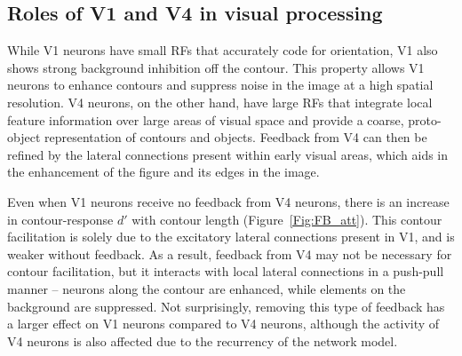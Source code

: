 {\subsection{Roles of V1 and V4 in visual processing}
While V1 neurons have
small RFs that accurately code for orientation, V1 also shows strong
background inhibition off the contour. This property allows V1 neurons
to enhance contours and suppress noise in the image at a high spatial
resolution. V4 neurons, on the other hand, have large RFs that integrate
local feature information over large areas of visual space and provide
a coarse, proto-object representation of contours and objects.
Feedback from V4 can then be refined by the lateral connections present
within early visual areas, which aids in the enhancement of the figure
and its edges in the image.



Even when V1 neurons receive no feedback from V4 neurons,
there is an increase in contour-response $d'$ with contour
length (Figure~\ref{Fig:FB_att}). This contour facilitation is solely due to the excitatory
lateral connections present in V1, and
is weaker
without feedback. As a result, feedback
from V4
%
 may not be necessary for
contour facilitation, but it interacts with local lateral connections
in a push-pull manner -- neurons along the contour are enhanced, while
elements on the background are suppressed. Not surprisingly, removing
this type of
%
feedback has a larger effect on V1 neurons compared to V4 neurons,
although the activity of V4 neurons is also affected due to the
recurrency of the network model.

}

